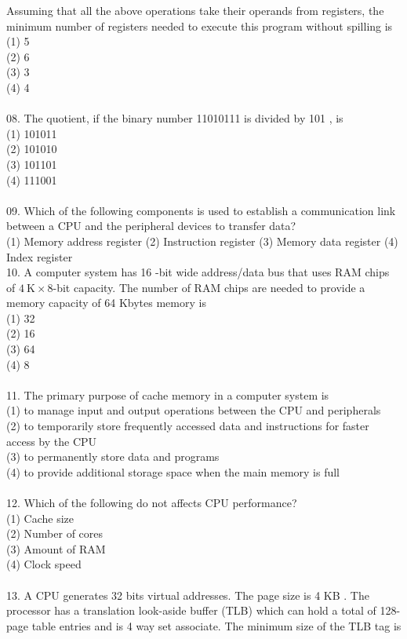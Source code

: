 \documentclass[10pt]{article}
\begin{document}
Assuming that all the above operations take their operands from registers, the minimum number of registers needed to execute this program without spilling is\\
(1) 5\\
(2) 6\\
(3) 3\\
(4) 4\\
\\
08. The quotient, if the binary number 11010111 is divided by 101 , is\\
(1) 101011\\
(2) 101010\\
(3) 101101\\
(4) 111001\\
\\
09. Which of the following components is used to establish a communication link between a CPU and the peripheral devices to transfer data?\\
(1) Memory address register (2) Instruction register (3) Memory data register (4) Index register\\
10. A computer system has 16 -bit wide address/data bus that uses RAM chips of $4 \mathrm{~K} \times 8$-bit capacity. The number of RAM chips are needed to provide a memory capacity of 64 Kbytes memory is\\
(1) 32\\
(2) 16\\
(3) 64\\
(4) 8\\
\\
11. The primary purpose of cache memory in a computer system is\\
(1) to manage input and output operations between the CPU and peripherals\\
(2) to temporarily store frequently accessed data and instructions for faster access by the CPU\\
(3) to permanently store data and programs\\
(4) to provide additional storage space when the main memory is full\\
\\
12. Which of the following do not affects CPU performance?\\
(1) Cache size\\
(2) Number of cores\\
(3) Amount of RAM\\
(4) Clock speed\\
\\
13. A CPU generates 32 bits virtual addresses. The page size is 4 KB . The processor has a translation look-aside buffer (TLB) which can hold a total of 128-page table entries and is 4 way set associate. The minimum size of the TLB tag is\\
\end{document}
